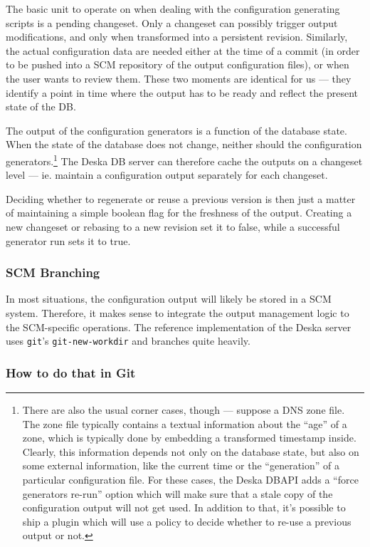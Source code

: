 \documentclass[deska]{subfiles}
\begin{document}
The basic unit to operate on when dealing with the configuration generating scripts is a pending changeset.  Only a
changeset can possibly trigger output modifications, and only when transformed into a persistent revision.  Similarly,
the actual configuration data are needed either at the time of a commit (in order to be pushed into a SCM repository of
the output configuration files), or when the user wants to review them.  These two moments are identical for us --- they
identify a point in time where the output has to be ready and reflect the present state of the DB.

The output of the configuration generators is a function of the database state.  When the state of the database does not
change, neither should the configuration generators.\footnote{There are also the usual corner cases, though --- suppose a
DNS zone file.  The zone file typically contains a textual information about the ``age'' of a zone, which is typically
done by embedding a transformed timestamp inside.  Clearly, this information depends not only on the database state, but
also on some external information, like the current time or the ``generation'' of a particular configuration file.  For
these cases, the Deska DBAPI adds a ``force generators re-run'' option which will make sure that a stale copy of the
configuration output will not get used.  In addition to that, it's possible to ship a plugin which will use a policy to
decide whether to re-use a previous output or not.}  The Deska DB server can therefore cache the outputs on a changeset
level --- ie. maintain a configuration output separately for each changeset.

Deciding whether to regenerate or reuse a previous version is then just a matter of maintaining a simple boolean flag
for the freshness of the output.  Creating a new changeset or rebasing to a new revision set it to false, while a
successful generator run sets it to true.

\subsubsection{SCM Branching}

In most situations, the configuration output will likely be stored in a SCM system.  Therefore, it makes sense to
integrate the output management logic to the SCM-specific operations.  The reference implementation of the Deska server
uses {\tt git}'s {\tt git-new-workdir} and branches quite heavily.

\subsubsection{How to do that in Git}
\label{sec:cfggen-git}
\end{document}
